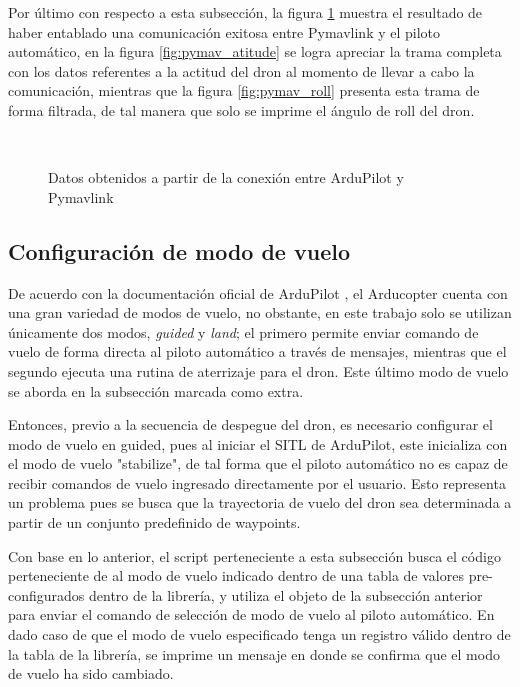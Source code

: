 Por último con respecto a esta subsección, la figura \ref{fig:pymav_listen} muestra el resultado de haber entablado una comunicación exitosa entre Pymavlink y el piloto automático, en la figura \ref{fig:pymav_atitude} se logra apreciar la trama completa con los datos referentes a la actitud del dron al momento de llevar a cabo la comunicación, mientras que la figura \ref{fig:pymav_roll} presenta esta trama de forma filtrada, de tal manera que solo se imprime el ángulo de roll del dron.
 

\begin{figure}[ht]
    \centering
    \\
    \caption{Datos obtenidos a partir de la conexión entre ArduPilot y Pymavlink} 
    \label{fig:pymav_listen}
\end{figure}


\subsection{Configuración de modo de vuelo}

De acuerdo con la documentación oficial de ArduPilot \cite{Ardu_modes}, el Arducopter cuenta con una gran variedad de modos de vuelo, no obstante, en este trabajo solo se utilizan únicamente dos modos, \textit{guided} y \textit{land}; el primero permite enviar comando de vuelo de forma directa al piloto automático a través de mensajes, mientras que el segundo ejecuta una rutina de aterrizaje para el dron. Este último modo de vuelo se aborda en la subsección marcada como extra.

Entonces, previo a la secuencia de despegue del dron, es necesario configurar el modo de vuelo en guided, pues al iniciar el SITL de ArduPilot, este inicializa con el modo de vuelo "stabilize", de tal forma que el piloto automático no es capaz de recibir comandos de vuelo ingresado directamente por el usuario. Esto representa un problema pues se busca que la trayectoria de vuelo del dron sea determinada a partir de un conjunto predefinido de waypoints.

Con base en lo anterior, el script perteneciente a esta subsección busca el código perteneciente de al modo de vuelo indicado dentro de una tabla de valores pre-configurados dentro de la librería, y utiliza el objeto de la subsección anterior para enviar el comando de selección de modo de vuelo al piloto automático. En dado caso de que el modo de vuelo especificado tenga un registro válido dentro de la tabla de la librería, se imprime un mensaje en donde se confirma que el modo de vuelo ha sido cambiado.

